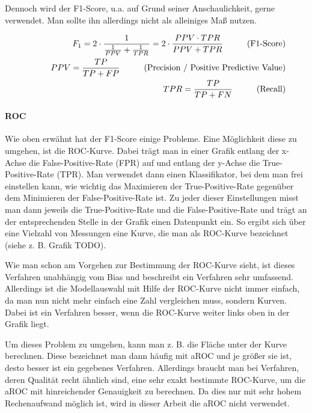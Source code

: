Dennoch wird der F1-Score, u.a. auf Grund seiner Anschaulichkeit, gerne verwendet. Man sollte ihn allerdings nicht als alleiniges Maß nutzen.

\begin{eqnarray} \label{f1Score}
    \hspace{1cm} F_1 = 2 \cdot \frac{1}{\frac{1}{PPV} + \frac{1}{TPR}} = 2 \cdot \frac{PPV \cdot TPR}{PPV + TPR} \text{\hspace{1cm}(F1-Score)}\\
    \hspace{1cm} PPV = \frac{TP}{TP + FP} \text{\hspace{1cm}(Precision / Positive Predictive Value)} \\
    \hspace{1cm} TPR = \frac{TP}{TP + FN} \text{\hspace{1cm}(Recall)}
\end{eqnarray}


\paragraph{ROC}

Wie oben erwähnt hat der F1-Score einige Probleme. Eine Möglichkeit diese zu umgehen, ist die ROC-Kurve.
Dabei trägt man in einer Grafik entlang der x-Achse die False-Positive-Rate (FPR) auf und entlang der y-Achse die True-Positive-Rate (TPR). Man verwendet dann einen Klassifikator, bei dem man frei einstellen kann, wie wichtig das Maximieren der True-Positive-Rate gegenüber dem Minimieren der False-Positive-Rate ist. Zu jeder dieser Einstellungen misst man dann jeweils die True-Positive-Rate und die False-Positive-Rate und trägt an der entsprechenden Stelle in der Grafik einen Datenpunkt ein. So ergibt sich über eine Vielzahl von Messungen eine Kurve, die man als ROC-Kurve bezeichnet (siehe z. B. Grafik TODO).

Wie man schon am Vorgehen zur Bestimmung der ROC-Kurve sieht, ist dieses Verfahren unabhängig vom Bias und beschreibt ein Verfahren sehr umfassend. Allerdings ist die Modellauswahl mit Hilfe der ROC-Kurve nicht immer einfach, da man nun nicht mehr einfach eine Zahl vergleichen muss, sondern Kurven. Dabei ist ein Verfahren besser, wenn die ROC-Kurve weiter links oben in der Grafik liegt.

Um dieses Problem zu umgehen, kann man z. B. die Fläche unter der Kurve berechnen. Diese bezeichnet man dann häufig mit aROC und je größer sie ist, desto besser ist ein gegebenes Verfahren. Allerdings braucht man bei Verfahren, deren Qualität recht ähnlich sind, eine sehr exakt bestimmte ROC-Kurve, um die aROC mit hinreichender Genauigkeit zu berechnen. Da dies nur mit sehr hohem Rechenaufwand möglich ist, wird in dieser Arbeit die aROC nicht verwendet.

